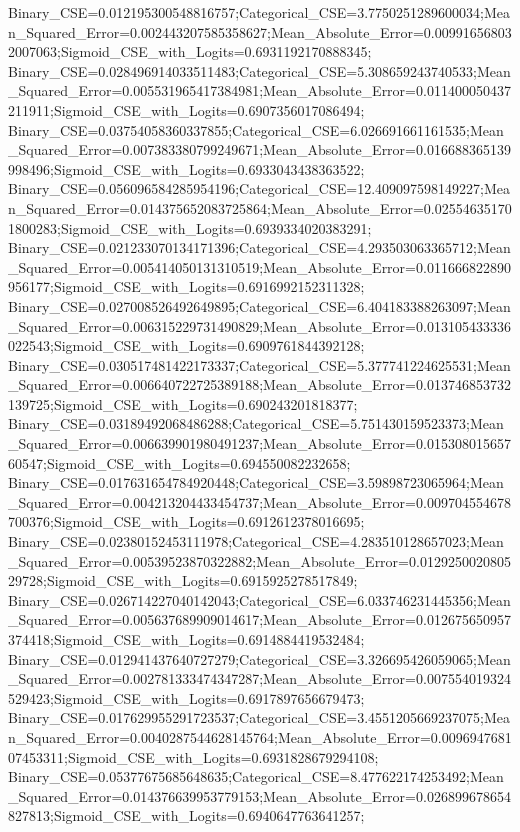 Binary_CSE=0.012195300548816757;Categorical_CSE=3.7750251289600034;Mean_Squared_Error=0.002443207585358627;Mean_Absolute_Error=0.009916568032007063;Sigmoid_CSE_with_Logits=0.6931192170888345;
Binary_CSE=0.028496914033511483;Categorical_CSE=5.308659243740533;Mean_Squared_Error=0.005531965417384981;Mean_Absolute_Error=0.011400050437211911;Sigmoid_CSE_with_Logits=0.6907356017086494;
Binary_CSE=0.03754058360337855;Categorical_CSE=6.026691661161535;Mean_Squared_Error=0.007383380799249671;Mean_Absolute_Error=0.016688365139998496;Sigmoid_CSE_with_Logits=0.6933043438363522;
Binary_CSE=0.056096584285954196;Categorical_CSE=12.409097598149227;Mean_Squared_Error=0.014375652083725864;Mean_Absolute_Error=0.025546351701800283;Sigmoid_CSE_with_Logits=0.6939334020383291;
Binary_CSE=0.021233070134171396;Categorical_CSE=4.293503063365712;Mean_Squared_Error=0.005414050131310519;Mean_Absolute_Error=0.011666822890956177;Sigmoid_CSE_with_Logits=0.6916992152311328;
Binary_CSE=0.027008526492649895;Categorical_CSE=6.404183388263097;Mean_Squared_Error=0.006315229731490829;Mean_Absolute_Error=0.013105433336022543;Sigmoid_CSE_with_Logits=0.6909761844392128;
Binary_CSE=0.030517481422173337;Categorical_CSE=5.377741224625531;Mean_Squared_Error=0.006640722725389188;Mean_Absolute_Error=0.013746853732139725;Sigmoid_CSE_with_Logits=0.690243201818377;
Binary_CSE=0.03189492068486288;Categorical_CSE=5.751430159523373;Mean_Squared_Error=0.006639901980491237;Mean_Absolute_Error=0.01530801565760547;Sigmoid_CSE_with_Logits=0.694550082232658;
Binary_CSE=0.017631654784920448;Categorical_CSE=3.59898723065964;Mean_Squared_Error=0.004213204433454737;Mean_Absolute_Error=0.009704554678700376;Sigmoid_CSE_with_Logits=0.6912612378016695;
Binary_CSE=0.02380152453111978;Categorical_CSE=4.283510128657023;Mean_Squared_Error=0.00539523870322882;Mean_Absolute_Error=0.012925002080529728;Sigmoid_CSE_with_Logits=0.6915925278517849;
Binary_CSE=0.026714227040142043;Categorical_CSE=6.033746231445356;Mean_Squared_Error=0.005637689909014617;Mean_Absolute_Error=0.012675650957374418;Sigmoid_CSE_with_Logits=0.6914884419532484;
Binary_CSE=0.012941437640727279;Categorical_CSE=3.326695426059065;Mean_Squared_Error=0.002781333474347287;Mean_Absolute_Error=0.007554019324529423;Sigmoid_CSE_with_Logits=0.6917897656679473;
Binary_CSE=0.017629955291723537;Categorical_CSE=3.4551205669237075;Mean_Squared_Error=0.0040287544628145764;Mean_Absolute_Error=0.009694768107453311;Sigmoid_CSE_with_Logits=0.6931828679294108;
Binary_CSE=0.05377675685648635;Categorical_CSE=8.477622174253492;Mean_Squared_Error=0.014376639953779153;Mean_Absolute_Error=0.026899678654827813;Sigmoid_CSE_with_Logits=0.6940647763641257;

